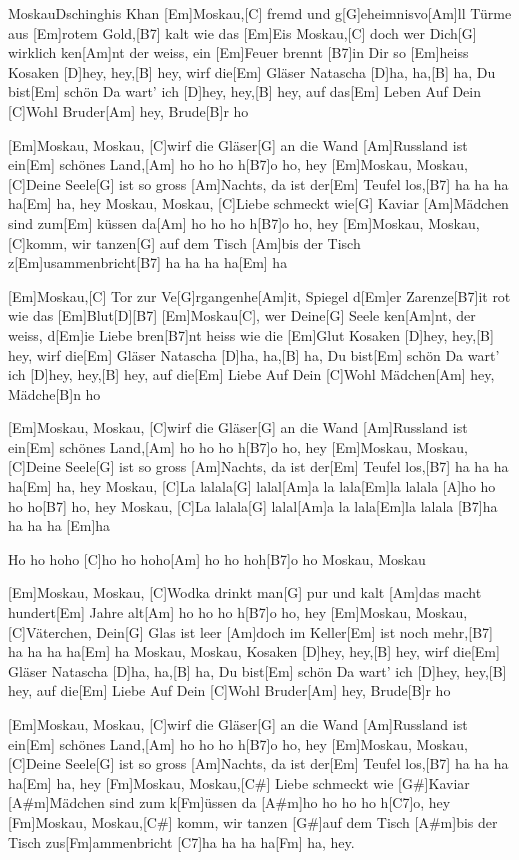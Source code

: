 \documentclass[../main.tex]{subfiles}
\begin{document}
\begin{song}[1]{Moskau}{Dschinghis Khan}{}
[Em]Moskau,[C] fremd und g[G]eheimnisvo[Am]ll
Türme aus [Em]rotem Gold,[B7] kalt wie das [Em]Eis
Moskau,[C] doch wer Dich[G] wirklich ken[Am]nt
der weiss, ein [Em]Feuer brennt [B7]in Dir so [Em]heiss
Kosaken [D]hey, hey,[B] hey, wirf die[Em] Gläser
Natascha [D]ha, ha,[B] ha, Du bist[Em] schön
Da wart' ich [D]hey, hey,[B] hey, auf das[Em] Leben
Auf Dein [C]Wohl Bruder[Am] hey, Brude[B]r ho

[Em]Moskau, Moskau, [C]wirf die Gläser[G] an die Wand
[Am]Russland ist ein[Em] schönes Land,[Am] ho ho ho h[B7]o ho, hey
[Em]Moskau, Moskau, [C]Deine Seele[G] ist so gross
[Am]Nachts, da ist der[Em] Teufel los,[B7] ha ha ha ha[Em] ha, hey
Moskau, Moskau, [C]Liebe schmeckt wie[G] Kaviar
[Am]Mädchen sind zum[Em] küssen da[Am] ho ho ho h[B7]o ho, hey
[Em]Moskau, Moskau, [C]komm, wir tanzen[G] auf dem Tisch
[Am]bis der Tisch z[Em]usammenbricht[B7] ha ha ha ha[Em] ha

[Em]Moskau,[C] Tor zur Ve[G]rgangenhe[Am]it, Spiegel d[Em]er Zarenze[B7]it
rot wie das [Em]Blut[D]{\hh}[B7]{\hh}
[Em]Moskau[C], wer Deine[G] Seele ken[Am]nt, der weiss, d[Em]ie Liebe bren[B7]nt
heiss wie die [Em]Glut
Kosaken [D]hey, hey,[B] hey, wirf die[Em] Gläser
Natascha [D]ha, ha,[B] ha, Du bist[Em] schön
Da wart' ich [D]hey, hey,[B] hey, auf die[Em] Liebe
Auf Dein [C]Wohl Mädchen[Am] hey, Mädche[B]n ho

[Em]Moskau, Moskau, [C]wirf die Gläser[G] an die Wand
[Am]Russland ist ein[Em] schönes Land,[Am] ho ho ho h[B7]o ho, hey
[Em]Moskau, Moskau, [C]Deine Seele[G] ist so gross
[Am]Nachts, da ist der[Em] Teufel los,[B7] ha ha ha ha[Em] ha, hey
Moskau, [C]La lalala[G] lalal[Am]a la lala[Em]la lalala
[A]ho ho ho ho[B7] ho, hey
Moskau, [C]La lalala[G] lalal[Am]a la lala[Em]la lalala
[B7]ha ha ha ha [Em]ha

Ho ho hoho [C]ho ho hoho[Am] ho ho hoh[B7]o ho Moskau, Moskau

[Em]Moskau, Moskau, [C]Wodka drinkt man[G] pur und kalt
[Am]das macht hundert[Em] Jahre alt[Am] ho ho ho h[B7]o ho, hey
[Em]Moskau, Moskau, [C]Väterchen, Dein[G] Glas ist leer
[Am]doch im Keller[Em] ist noch mehr,[B7] ha ha ha ha[Em] ha
Moskau, Moskau, Kosaken [D]hey, hey,[B] hey, wirf die[Em] Gläser
Natascha [D]ha, ha,[B] ha, Du bist[Em] schön
Da wart' ich [D]hey, hey,[B] hey, auf die[Em] Liebe
Auf Dein [C]Wohl Bruder[Am] hey, Brude[B]r ho

[Em]Moskau, Moskau, [C]wirf die Gläser[G] an die Wand
[Am]Russland ist ein[Em] schönes Land,[Am] ho ho ho h[B7]o ho, hey
[Em]Moskau, Moskau, [C]Deine Seele[G] ist so gross
[Am]Nachts, da ist der[Em] Teufel los,[B7] ha ha ha ha[Em] ha, hey
[Fm]Moskau, Moskau,[C#] Liebe schmeckt wie [G#]Kaviar
[A#m]Mädchen sind zum k[Fm]{ü}ssen da [A#m]ho ho ho ho h[C7]o, hey
[Fm]Moskau, Moskau,[C#] komm, wir tanzen [G#]auf dem Tisch
[A#m]bis der Tisch zus[Fm]ammenbricht [C7]ha ha ha ha[Fm] ha, hey.

\end{song}
\end{document}
